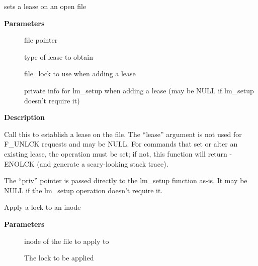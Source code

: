 \documentclass[a4paper,8pt,english]{sphinxmanual}
\begin{document}
\begin{fulllineitems}
\label{filesystems/index:c.vfs_setlease}
sets a lease on an open file

\end{fulllineitems}


\textbf{Parameters}
\begin{description}
\item[{}] \leavevmode
file pointer

\item[{}] \leavevmode
type of lease to obtain

\item[{}] \leavevmode
file\_lock to use when adding a lease

\item[{}] \leavevmode
private info for lm\_setup when adding a lease (may be
NULL if lm\_setup doesn't require it)

\end{description}

\textbf{Description}

Call this to establish a lease on the file. The ``lease'' argument is not
used for F\_UNLCK requests and may be NULL. For commands that set or alter
an existing lease, the  operation must be
set; if not, this function will return -ENOLCK (and generate a scary-looking
stack trace).

The ``priv'' pointer is passed directly to the lm\_setup function as-is. It
may be NULL if the lm\_setup operation doesn't require it.

\begin{fulllineitems}
\label{filesystems/index:c.locks_lock_inode_wait}
Apply a lock to an inode

\end{fulllineitems}


\textbf{Parameters}
\begin{description}
\item[{}] \leavevmode
inode of the file to apply to

\item[{}] \leavevmode
The lock to be applied

\end{description}
\end{document}
